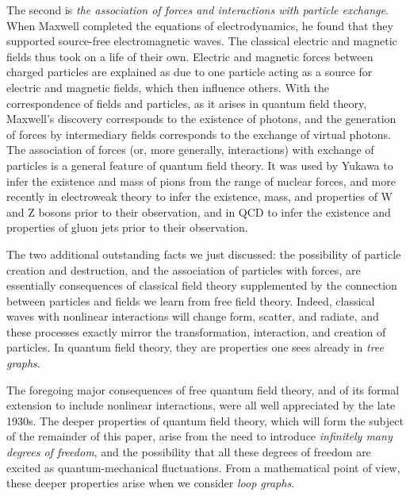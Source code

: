 \documentclass[12pt]{article}
\begin{document}
The second is {\it the association of forces and
interactions with particle exchange}.  When Maxwell completed the
equations of electrodynamics, he found that they supported source-free
electromagnetic waves.  The classical electric and magnetic fields
thus took on a life of their own.  Electric and magnetic forces
between charged particles are explained as due to one particle acting
as a source for electric and magnetic fields, which then influence
others.  With the correspondence of fields and particles, as it arises
in quantum field theory, Maxwell's discovery corresponds to the
existence of photons, and the generation of forces by intermediary
fields corresponds to the exchange of virtual photons.  The
association of forces (or, more generally, interactions) with exchange
of particles is a general feature of quantum field theory.  It was
used by Yukawa to infer the existence and mass of pions from the range
of nuclear forces, and more recently in electroweak theory to infer
the existence, mass, and properties of W and Z bosons prior to their
observation, and in QCD to infer the existence and properties of gluon
jets prior to their observation.

The two additional outstanding facts we just discussed: the
possibility of particle creation and destruction, and the association
of particles with forces, are essentially consequences of classical
field theory supplemented by the connection between particles and
fields we learn from free field theory.  Indeed, classical waves with
nonlinear interactions will change form, scatter, and radiate, and
these processes exactly mirror the transformation, interaction, and
creation of particles.  In quantum field theory, they are properties
one sees already in {\it tree graphs}.

The foregoing major consequences of free quantum field
theory, and of its formal extension to include nonlinear interactions,
were all well appreciated by the late 1930s.  The deeper properties of
quantum field theory, which will form the subject of the remainder of
this paper, arise from the need to introduce {\it infinitely many
degrees of freedom}, and the possibility that all these degrees of
freedom are excited as quantum-mechanical fluctuations.  From a
mathematical point of view, these deeper properties arise when we
consider {\it loop graphs}.  
\end{document}
